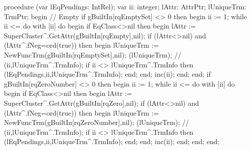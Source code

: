 \nwenddocs{}\endmoddef\nwstartdeflinemarkup\nwenddeflinemarkup
procedure (var lEqPendings: IntRel);
var
   ii: integer;
   lAttr: AttrPtr;
   lUniqueTrm: TrmPtr;
begin
   //  Empty
   if gBuiltIn[rqEmptySet] <> 0 then
   begin
      ii := 1;
      while ii <=  do
         with [ii] do
      begin
         if  EqClass<>nil then
         begin
            lAttr := SuperCluster^.GetAttr(gBuiltIn[rqEmpty],nil);
            if (lAttr<>nil) and (lAttr^.fNeg=ord(true)) then
            begin lUniqueTrm := NewFuncTrm(gBuiltIn[rqEmptySet],nil);
            (lUniqueTrm);
            //         (ii,lUniqueTrm^.TrmInfo);
            if ii <> lUniqueTrm^.TrmInfo then
               (lEqPendings,ii,lUniqueTrm^.TrmInfo);
            end;
         end;
         inc(ii);
      end;
   end;
   if gBuiltIn[rqZeroNumber] <> 0 then
   begin
      ii := 1;
      while ii <=  do
         with [ii] do
      begin
         if  EqClass<>nil then
         begin
            lAttr := SuperCluster^.GetAttr(gBuiltIn[rqZero],nil);
            if (lAttr<>nil) and (lAttr^.fNeg=ord(true)) then
            begin
               lUniqueTrm := NewFuncTrm(gBuiltIn[rqZeroNumber],nil);
               (lUniqueTrm);
               //         (ii,lUniqueTrm^.TrmInfo);
               if ii <> lUniqueTrm^.TrmInfo then
                  (lEqPendings,ii,lUniqueTrm^.TrmInfo);
            end;
         end;
         inc(ii);
      end;
   end;
end;

